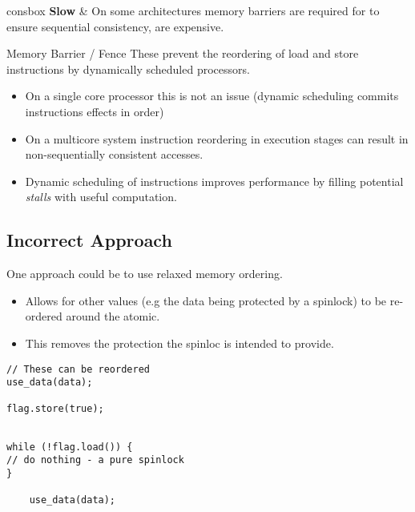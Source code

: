 \begin{tabbox}{consbox}
  \textbf{Slow} &  On some architectures memory barriers are required for to ensure sequential consistency, are expensive. \\
\end{tabbox}

\begin{definitionbox}{Memory Barrier / Fence}
  These prevent the reordering of load and store instructions by dynamically scheduled processors.
  \begin{itemize}
    \item On a single core processor this is not an issue (dynamic scheduling commits instructions effects in order)
    \item On a multicore system instruction reordering in execution stages can result in non-sequentially consistent accesses.
    \item Dynamic scheduling of instructions improves performance by filling potential \textit{stalls} with useful computation.
  \end{itemize}
\end{definitionbox}

\subsection{Incorrect Approach}
One approach could be to use relaxed memory ordering.
\begin{itemize}
  \item Allows for other values (e.g the data being protected by a spinlock) to be re-ordered around the atomic.
  \item This removes the protection the spinloc is intended to provide.
\end{itemize}

\begin{minipage}{.49\textwidth}
    \begin{verbatim}
// These can be reordered
use_data(data);

flag.store(true);
  
    \end{verbatim}
  \end{minipage}
  \hfill
  \begin{minipage}{.49\textwidth}
    \begin{verbatim}
while (!flag.load()) {
// do nothing - a pure spinlock
}

    use_data(data);
    \end{verbatim}
  \end{minipage}


